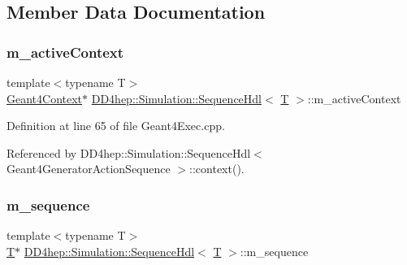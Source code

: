 \subsection{Member Data Documentation}
\hypertarget{class_d_d4hep_1_1_simulation_1_1_sequence_hdl_addf2b3ddaa1263ae4213a5189f7859b5}{}\label{class_d_d4hep_1_1_simulation_1_1_sequence_hdl_addf2b3ddaa1263ae4213a5189f7859b5} 
\subsubsection{\texorpdfstring{m\+\_\+active\+Context}{m\_activeContext}}
{\footnotesize\ttfamily template$<$typename T$>$ \\
\hyperlink{class_d_d4hep_1_1_simulation_1_1_geant4_context}{Geant4\+Context}$\ast$ \hyperlink{class_d_d4hep_1_1_simulation_1_1_sequence_hdl}{D\+D4hep\+::\+Simulation\+::\+Sequence\+Hdl}$<$ \hyperlink{class_t}{T} $>$\+::m\+\_\+active\+Context\hspace{0.3cm}{\ttfamily [mutable]}}



Definition at line 65 of file Geant4\+Exec.\+cpp.



Referenced by D\+D4hep\+::\+Simulation\+::\+Sequence\+Hdl$<$ Geant4\+Generator\+Action\+Sequence $>$\+::context().

\hypertarget{class_d_d4hep_1_1_simulation_1_1_sequence_hdl_ae825c3a994baf6bb24fd37e547a67dff}{}\label{class_d_d4hep_1_1_simulation_1_1_sequence_hdl_ae825c3a994baf6bb24fd37e547a67dff} 
\subsubsection{\texorpdfstring{m\+\_\+sequence}{m\_sequence}}
{\footnotesize\ttfamily template$<$typename T$>$ \\
\hyperlink{class_t}{T}$\ast$ \hyperlink{class_d_d4hep_1_1_simulation_1_1_sequence_hdl}{D\+D4hep\+::\+Simulation\+::\+Sequence\+Hdl}$<$ \hyperlink{class_t}{T} $>$\+::m\+\_\+sequence}



